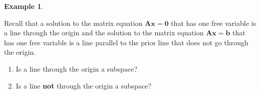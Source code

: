 \documentclass[
]{book}
\theoremstyle{definition}
\theoremstyle{definition}
\newtheorem{example}{Example}[chapter]
\theoremstyle{definition}
\theoremstyle{remark}
\begin{document}
\begin{example}
\protect\hypertarget{exm:unlabeled-div-82}{}\label{exm:unlabeled-div-82}

Recall that a solution to the matrix equation \(\mathbf{A} \mathbf{x} = \mathbf{0}\) that has one free variable is a line through the origin and the solution to the matrix equation \(\mathbf{A} \mathbf{x} = \mathbf{b}\) that has one free variable is a line parallel to the prior line that does not go through the origin.

\begin{enumerate}
\def\labelenumi{\Alph{enumi})}
\item
  Is a line through the origin a subspace?
\item
  Is a line \textbf{not} through the origin a subspace?
\end{enumerate}

\end{example}
\end{document}
